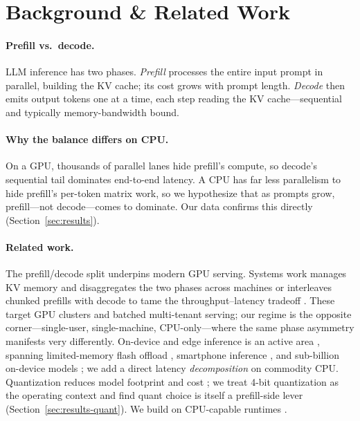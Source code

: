 \documentclass[sigconf,nonacm,10pt]{acmart}
\begin{document}
\section{Background \& Related Work}
\label{sec:background}

\paragraph{Prefill vs.\ decode.}
LLM inference has two phases. \emph{Prefill} processes the entire input
prompt in parallel, building the KV cache; its cost grows with prompt
length. \emph{Decode} then emits output tokens one at a time, each step
reading the KV cache---sequential and typically memory-bandwidth bound.

\paragraph{Why the balance differs on CPU.}
On a GPU, thousands of parallel lanes hide prefill's compute, so decode's
sequential tail dominates end-to-end latency. A CPU has far less
parallelism to hide prefill's per-token matrix work, so we hypothesize
that as prompts grow, prefill---not decode---comes to dominate. Our data
confirms this directly (Section~\ref{sec:results}).

\paragraph{Related work.}
The prefill/decode split underpins modern GPU serving. Systems work
manages KV memory \cite{kwon2023pagedattention} and disaggregates the two
phases across machines \cite{patel2024splitwise, zhong2024distserve} or
interleaves chunked prefills with decode to tame the throughput--latency
tradeoff \cite{agrawal2024sarathi}. These target GPU clusters and batched
multi-tenant serving; our regime is the opposite corner---single-user,
single-machine, CPU-only---where the same phase asymmetry manifests very
differently. On-device and edge inference is an active area
\cite{xu2024ondevicereview}, spanning limited-memory flash offload
\cite{alizadeh2024llmflash}, smartphone inference \cite{xue2024powerinfer2},
and sub-billion on-device models \cite{liu2024mobilellm}; we add a direct
latency \emph{decomposition} on commodity CPU. Quantization reduces model
footprint and cost \cite{dettmers2022llmint8, frantar2023gptq,
xiao2023smoothquant, lin2024awq}; we treat 4-bit quantization as the
operating context and find quant choice is itself a prefill-side lever
(Section~\ref{sec:results-quant}). We build on CPU-capable runtimes
\cite{gerganov2023llamacpp, shen2023efficientcpu}.
\end{document}
